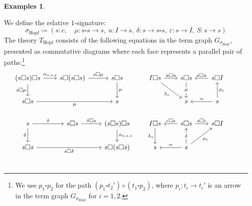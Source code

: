 \documentclass[11pt]{article}
\theoremstyle{plain}
\theoremstyle{definition}
\newtheorem{examples}[theorem]{Examples}
\numberwithin{equation}{section}
\begin{document}
\begin{examples}
\begin{enumerate}
    We define the relative $1$-signature:
    $$
    \sigma_{\text{Hopf}} \coloneqq (s\colon c, \quad \mu\colon s \square s \to s, \ u\colon I \to s, \ \delta\colon s \to s \square s, \ \varepsilon\colon s \to I, \ S\colon s \to s)
    $$
    The theory $T_{\text{Hopf}}$ consists of the following equations in the term graph $G_{\sigma_{\text{Hopf}}}$, presented as commutative diagrams where each face represents a parallel pair of paths:\footnote{We use $p_1\square p_2$ for the path $(p_1\square t_2')\circ (t_1\square p_2)$, where $p_i\colon t_i\to t_i'$ is an arrow in the term graph $G_{\sigma_{\mathrm{Hopf}}}$ for $i = 1,2$.}
    {\small $$
\begin{tikzcd}[column sep = 0.7 cm]
(s\square s)\square s \arrow[d, "s\square \mu"'] \arrow[r, "{\alpha_{s,s,s}}"] & s\square (s\square s) \arrow[r, "s\square \mu"]              & s\square s \arrow[d, "\mu"]                                         & I\square s \arrow[rd, "\lambda_s"'] \arrow[r, "u\square s"]              & s\square s \arrow[d, "\mu" description]                                         & s\square I \arrow[l, "s\square u"']    &                        \\
s\square s \arrow[rr, "\mu"']                                                  &                                                              & s                                                                   &                                                                          & s                                                                               & s \arrow[l, "="'] \arrow[u, "\rho_s"'] &                        \\
s \arrow[d, "\delta"'] \arrow[r, "\delta"]                                     & s\square s \arrow[r, "\delta\square s"]                      & (s\square s)\square s \arrow[d, "{\alpha_{s,s,s}}"]                 & I\square s \arrow[d, "\lambda_s"']                                       & s\square s \arrow[l, "\varepsilon\square s"'] \arrow[r, "s\square \varepsilon"] & s\square I                             &                        \\
s\square s \arrow[rr, "s\square \delta"']                                      &                                                              & s\square(s\square s)                                                & s                                                                        & s \arrow[l, "="'] \arrow[u, "\delta" description] \arrow[ru, "\rho_s"']         &                                        &                        \\

\end{tikzcd}$$}
\end{enumerate}
\end{examples}
\end{document}
